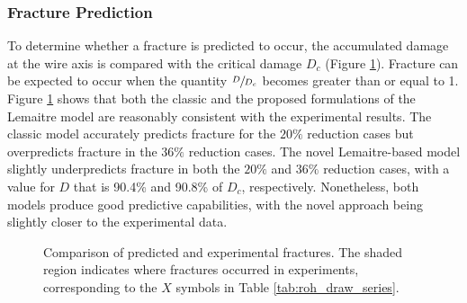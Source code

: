 \documentclass[sn-mathphys,Numbered]{sn-jnl}%
\begin{document}
\subsubsection{Fracture Prediction}
To determine whether a fracture is predicted to occur, the accumulated damage at the wire axis is compared with the critical damage $D_c$ (Figure \ref{fig:final_damage}).
Fracture can be expected to occur when the quantity $\sfrac{D}{D_c}$ becomes greater than or equal to 1.
Figure \ref{fig:final_damage} shows that both the classic and the proposed formulations of the Lemaitre model are reasonably consistent with the experimental results.
The classic model accurately predicts fracture for the $20\%$ reduction cases but overpredicts fracture in the $36\%$ reduction cases.
The novel Lemaitre-based model slightly underpredicts fracture in both the $20\%$ and $36\%$ reduction cases, with a value for $D$ that is 90.4\% and 90.8\% of $D_c$, respectively.
Nonetheless, both models produce good predictive capabilities, with the novel approach being slightly closer to the experimental data.
\begin{figure}[htbp]
	\centering
		\caption{Comparison of predicted and experimental fractures. The shaded region indicates where fractures occurred in experiments, corresponding to the $X$ symbols in Table \ref{tab:roh_draw_series}.}
	\label{fig:final_damage}
\end{figure}
\end{document}
